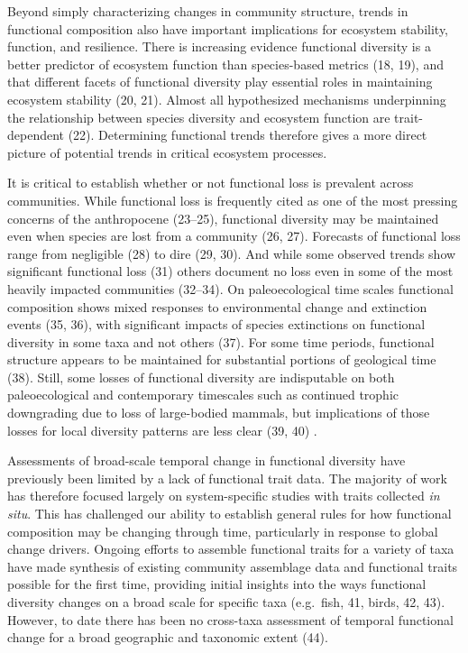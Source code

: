 \documentclass{article}
\begin{document}
Beyond simply characterizing changes in community structure, trends in
functional composition also have important implications for ecosystem
stability, function, and resilience. There is increasing evidence
functional diversity is a better predictor of ecosystem function than
species-based metrics (18, 19), and that different facets of functional
diversity play essential roles in maintaining ecosystem stability (20,
21). Almost all hypothesized mechanisms underpinning the relationship
between species diversity and ecosystem function are trait-dependent
(22). Determining functional trends therefore gives a more direct
picture of potential trends in critical ecosystem processes.

It is critical to establish whether or not functional loss is prevalent
across communities. While functional loss is frequently cited as one of
the most pressing concerns of the anthropocene (23--25), functional
diversity may be maintained even when species are lost from a community
(26, 27). Forecasts of functional loss range from negligible (28) to
dire (29, 30). And while some observed trends show significant
functional loss (31) others document no loss even in some of the most
heavily impacted communities (32--34). On paleoecological time scales
functional composition shows mixed responses to environmental change and
extinction events (35, 36), with significant impacts of species
extinctions on functional diversity in some taxa and not others (37).
For some time periods, functional structure appears to be maintained for
substantial portions of geological time (38). Still, some losses of
functional diversity are indisputable on both paleoecological and
contemporary timescales such as continued trophic downgrading due to
loss of large-bodied mammals, but implications of those losses for local
diversity patterns are less clear (39, 40) .

Assessments of broad-scale temporal change in functional diversity have
previously been limited by a lack of functional trait data. The majority
of work has therefore focused largely on system-specific studies with
traits collected \emph{in situ}. This has challenged our ability to
establish general rules for how functional composition may be changing
through time, particularly in response to global change drivers. Ongoing
efforts to assemble functional traits for a variety of taxa have made
synthesis of existing community assemblage data and functional traits
possible for the first time, providing initial insights into the ways
functional diversity changes on a broad scale for specific taxa
(e.g.~fish, 41, birds, 42, 43). However, to date there has been no
cross-taxa assessment of temporal functional change for a broad
geographic and taxonomic extent (44).
\end{document}
